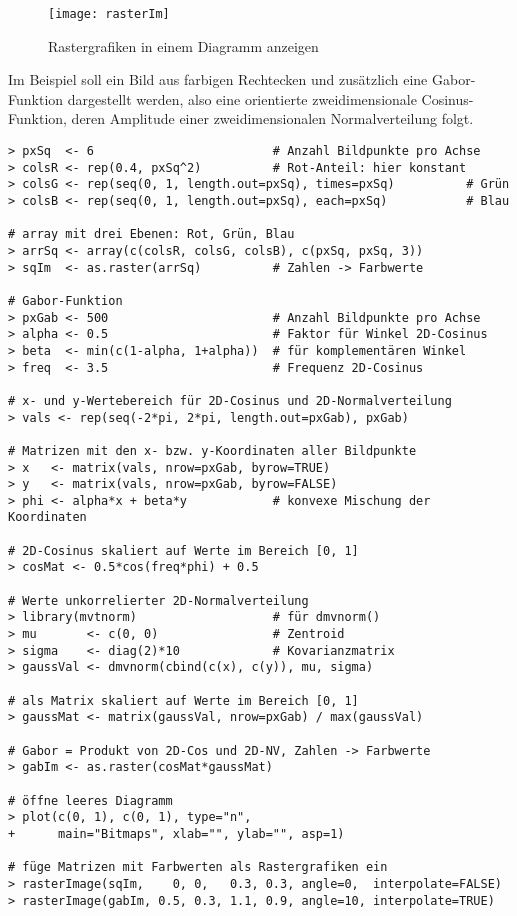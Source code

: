 \begin{figure}[ht]
\centering
\texttt{[image: rasterIm]}
\vspace*{-1em}
\caption{Rastergrafiken in einem Diagramm anzeigen}
\label{fig:rasterIm}
\end{figure}

Im Beispiel soll ein Bild aus farbigen Rechtecken und zusätzlich eine Gabor-Funktion dargestellt werden, also eine orientierte zweidimensionale Cosinus-Funktion, deren Amplitude einer zweidimensionalen Normalverteilung folgt.
\begin{lstlisting}
> pxSq  <- 6                         # Anzahl Bildpunkte pro Achse
> colsR <- rep(0.4, pxSq^2)          # Rot-Anteil: hier konstant
> colsG <- rep(seq(0, 1, length.out=pxSq), times=pxSq)          # Grün
> colsB <- rep(seq(0, 1, length.out=pxSq), each=pxSq)           # Blau

# array mit drei Ebenen: Rot, Grün, Blau
> arrSq <- array(c(colsR, colsG, colsB), c(pxSq, pxSq, 3))
> sqIm  <- as.raster(arrSq)          # Zahlen -> Farbwerte

# Gabor-Funktion
> pxGab <- 500                       # Anzahl Bildpunkte pro Achse
> alpha <- 0.5                       # Faktor für Winkel 2D-Cosinus
> beta  <- min(c(1-alpha, 1+alpha))  # für komplementären Winkel
> freq  <- 3.5                       # Frequenz 2D-Cosinus

# x- und y-Wertebereich für 2D-Cosinus und 2D-Normalverteilung
> vals <- rep(seq(-2*pi, 2*pi, length.out=pxGab), pxGab)

# Matrizen mit den x- bzw. y-Koordinaten aller Bildpunkte
> x   <- matrix(vals, nrow=pxGab, byrow=TRUE)
> y   <- matrix(vals, nrow=pxGab, byrow=FALSE)
> phi <- alpha*x + beta*y            # konvexe Mischung der Koordinaten

# 2D-Cosinus skaliert auf Werte im Bereich [0, 1]
> cosMat <- 0.5*cos(freq*phi) + 0.5

# Werte unkorrelierter 2D-Normalverteilung
> library(mvtnorm)                   # für dmvnorm()
> mu       <- c(0, 0)                # Zentroid
> sigma    <- diag(2)*10             # Kovarianzmatrix
> gaussVal <- dmvnorm(cbind(c(x), c(y)), mu, sigma)

# als Matrix skaliert auf Werte im Bereich [0, 1]
> gaussMat <- matrix(gaussVal, nrow=pxGab) / max(gaussVal)

# Gabor = Produkt von 2D-Cos und 2D-NV, Zahlen -> Farbwerte
> gabIm <- as.raster(cosMat*gaussMat)

# öffne leeres Diagramm
> plot(c(0, 1), c(0, 1), type="n",
+      main="Bitmaps", xlab="", ylab="", asp=1)

# füge Matrizen mit Farbwerten als Rastergrafiken ein
> rasterImage(sqIm,    0, 0,   0.3, 0.3, angle=0,  interpolate=FALSE)
> rasterImage(gabIm, 0.5, 0.3, 1.1, 0.9, angle=10, interpolate=TRUE)
\end{lstlisting}

